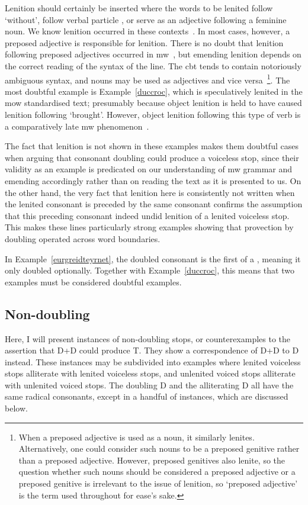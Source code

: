 Lenition should certainly be inserted where the words to be lenited follow  `without', follow verbal particle , or serve as an adjective following a feminine noun. We know lenition occurred in these contexts~\parencite[\S\S 20, 22, 23]{evans_grammar_1964}. 
In most cases, however, a preposed adjective is responsible for lenition. There is no doubt that lenition following preposed adjectives occurred in \gls{mw}~\parencite[\S 20]{evans_grammar_1964}, but emending lenition depends on the correct reading of the syntax of the line. The \gls{cbt} tends to contain notoriously ambiguous syntax, and nouns may be used as adjectives and vice versa~\parencite{daniel_cyfuniadau_2003}\footnote{When a preposed adjective is used as a noun, it similarly lenites. Alternatively, one could consider such nouns to be a preposed genitive rather than a preposed adjective. However, preposed genitives also lenite, so the question whether such nouns should be considered a preposed adjective or a preposed genitive is irrelevant to the issue of lenition, so `preposed adjective' is the term used throughout for ease's sake.}. 
The most doubtful example is Example~\ref{duccroc}, which is speculatively lenited in the \gls{mow} standardised text; presumably because object lenition is held to have caused lenition following  `brought'. However, object lenition following this type of verb is a comparatively late \gls{mw} phenomenon~\parencite[55-57]{vanSluisdevelopmentpostverballenition2014}. 

The fact that lenition is not shown in these examples makes them doubtful cases when arguing that consonant doubling could produce a voiceless stop, since their validity as an example is predicated on our understanding of \gls{mw} grammar and emending accordingly rather than on reading the text as it is presented to us. On the other hand, the very fact that lenition here is consistently not written when the lenited consonant is preceded by the same consonant confirms the assumption that this preceding consonant indeed undid  lenition of a lenited voiceless stop. This makes these lines particularly strong examples showing that provection by doubling operated across word boundaries.

In Example~\ref{eurgreidteyrnet}, the doubled consonant is the first of a , meaning it only doubled optionally. Together with Example~\ref{duccroc}, this means that two examples must be considered doubtful examples.

\subsection{Non-doubling}
Here, I will present instances of non-doubling stops, or counterexamples to the assertion that \gls{D}+\gls{D} could produce \gls{T}. They show a correspondence of \gls{D}+\gls{D} to \gls{D} instead. These instances may be subdivided into examples where lenited voiceless stops alliterate with lenited voiceless stops, and unlenited voiced stops alliterate with unlenited voiced stops. The doubling \gls{D} and the alliterating \gls{D} all have the same radical consonants, except in a handful of instances, which are discussed below.


